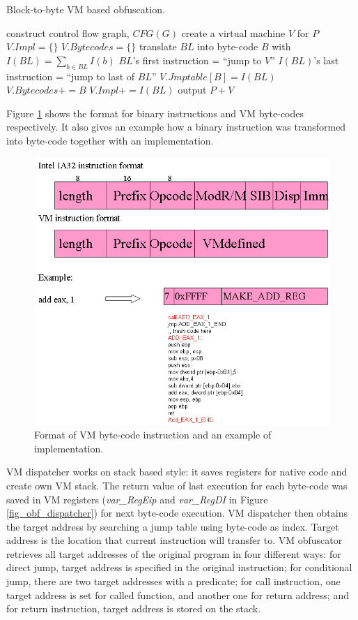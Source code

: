 \documentclass{../style/llncs}                   %
\begin{document}
\begin{algorithm}
\caption{Block-to-byte VM based obfuscation.}
\label{algo_obf_b2b_vm}
  construct control flow graph, $CFG(G)$\;
  create a virtual machine $V$ for $P$\;
  $V.Impl =\{\}$\;
  $V.Bytecodes =\{\}$\;
  {
     translate $BL$ into byte-code $B$ with $I(BL)=\sum_{b\in BL}I(b)$\;
     $BL$'s first instruction = ``jump to $V$''\;
     $I(BL)$'s last instruction = ``jump to last of $BL$''\;
     $V.Jmptable[B] = I(BL)$\;
     $V.Bytecodes += B$\;
     $V.Impl += I(BL)$\;
  }
  output $P+V$\;
\end{algorithm}

Figure \ref{fig_obf_bytecode} shows the format for binary
instructions and VM byte-codes respectively. It also gives
an example how a binary instruction was transformed into byte-code
together with an implementation.

\begin{figure}  \centering
\includegraphics[width=0.7\columnwidth]{./figure/fig_obf_bytecode}
\caption{Format of VM byte-code instruction and an example of implementation.}
\label{fig_obf_bytecode}
\end{figure}

VM dispatcher works on stack based style:
it saves registers for native code and create own VM stack.
The return value of last execution for each byte-code was saved in VM registers
(\emph{var\_RegEip} and \emph{var\_RegDI} in Figure \ref{fig_obf_dispatcher})
for next byte-code execution.
VM dispatcher then obtains the target address by searching a jump table using byte-code
as index.
Target address is the location that current instruction will transfer to.
VM obfuscator retrieves all target addresses of the original program in
four different ways:
for direct jump, target address is specified in the original instruction;
for conditional jump, there are two target addresses with a predicate;
for call instruction, one target address is set for called function, and
another one for return address;
and for return instruction, target address is stored on the stack.
\end{document}
